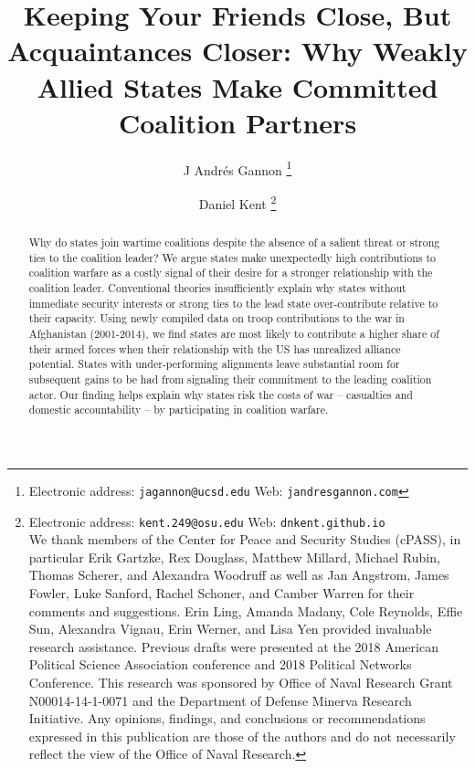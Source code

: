 \documentclass[12pt,letterpaper]{article}
\title{Keeping Your Friends Close, But Acquaintances Closer: Why Weakly Allied States Make Committed Coalition Partners}
\author{J Andr\'{e}s Gannon%
	\thanks{Electronic address: \texttt{jagannon@ucsd.edu} Web: \texttt{jandresgannon.com}}}
\affil{Department of Political Science \\ University of California, San Diego}
\author{Daniel Kent%
	\thanks{Electronic address: \texttt{kent.249@osu.edu} Web: \texttt{dnkent.github.io} \\ We thank members of the Center for Peace and Security Studies (cPASS), in particular Erik Gartzke, Rex Douglass, Matthew Millard, Michael Rubin, Thomas Scherer, and Alexandra Woodruff as well as Jan Angstrom, James Fowler, Luke Sanford, Rachel Schoner, and Camber Warren for their comments and suggestions. Erin Ling, Amanda Madany, Cole Reynolds, Effie Sun, Alexandra Vignau, Erin Werner, and Lisa Yen provided invaluable research assistance. Previous drafts were presented at the 2018 American Political Science Association conference and 2018 Political Networks Conference. This research was sponsored by Office of Naval Research Grant N00014-14-1-0071 and the Department of Defense Minerva Research Initiative. Any opinions, findings, and conclusions or recommendations expressed in this publication are those of the authors and do not necessarily reflect the view of the Office of Naval Research.}}
\affil{Department of Political Science \\ The Ohio State University}
\begin{document}
\maketitle

\begin{abstract}
	Why do states join wartime coalitions despite the absence of a salient threat or strong ties to the coalition leader? We argue states make unexpectedly high contributions to coalition warfare as a costly signal of their desire for a stronger relationship with the coalition leader. Conventional theories insufficiently explain why states without immediate security interests or strong ties to the lead state over-contribute relative to their capacity. Using newly compiled data on troop contributions to the war in Afghanistan (2001-2014), we find states are most likely to contribute a higher share of their armed forces when their relationship with the US has unrealized alliance potential. States with under-performing alignments leave substantial room for subsequent gains to be had from signaling their commitment to the leading coalition actor. Our finding helps explain why states risk the costs of war -- casualties and domestic accountability -- by participating in coalition warfare.
\end{abstract}
\end{document}
